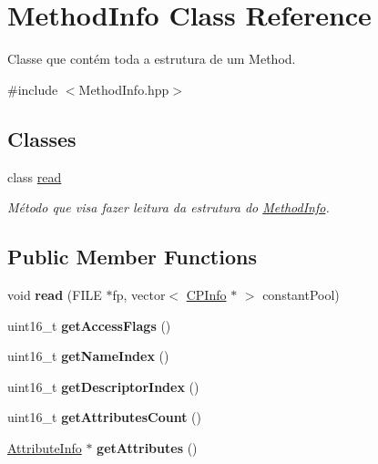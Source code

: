 \hypertarget{classMethodInfo}{}\section{Method\+Info Class Reference}
\label{classMethodInfo}


Classe que contém toda a estrutura de um Method.  




{\ttfamily \#include $<$Method\+Info.\+hpp$>$}

\subsection*{Classes}
\begin{DoxyCompactItemize}
\item 
class \hyperlink{classMethodInfo_1_1read}{read}
\begin{DoxyCompactList}\small\item\em Método que visa fazer leitura da estrutura do \hyperlink{classMethodInfo}{Method\+Info}. \end{DoxyCompactList}\end{DoxyCompactItemize}
\subsection*{Public Member Functions}
\begin{DoxyCompactItemize}
\item 
void {\bfseries read} (F\+I\+LE $\ast$fp, vector$<$ \hyperlink{classCPInfo}{C\+P\+Info} $\ast$ $>$ constant\+Pool)\hypertarget{classMethodInfo_a1826a1018fb2ef8938dd9acdf6482005}{}\label{classMethodInfo_a1826a1018fb2ef8938dd9acdf6482005}

\item 
uint16\+\_\+t {\bfseries get\+Access\+Flags} ()\hypertarget{classMethodInfo_ac6424df17f502e99e751e92b07e19e8c}{}\label{classMethodInfo_ac6424df17f502e99e751e92b07e19e8c}

\item 
uint16\+\_\+t {\bfseries get\+Name\+Index} ()\hypertarget{classMethodInfo_ab9bf8f3034c0efbcd3c1e21a51c47669}{}\label{classMethodInfo_ab9bf8f3034c0efbcd3c1e21a51c47669}

\item 
uint16\+\_\+t {\bfseries get\+Descriptor\+Index} ()\hypertarget{classMethodInfo_afde1ae485a86705d2c705c3b7083eb81}{}\label{classMethodInfo_afde1ae485a86705d2c705c3b7083eb81}

\item 
uint16\+\_\+t {\bfseries get\+Attributes\+Count} ()\hypertarget{classMethodInfo_ab01117659c442f22cb7fac899c50073b}{}\label{classMethodInfo_ab01117659c442f22cb7fac899c50073b}

\item 
\hyperlink{classAttributeInfo}{Attribute\+Info} $\ast$ {\bfseries get\+Attributes} ()\hypertarget{classMethodInfo_a96d5d3396e50e481059e1e2f37cdad50}{}\label{classMethodInfo_a96d5d3396e50e481059e1e2f37cdad50}

\end{DoxyCompactItemize}
